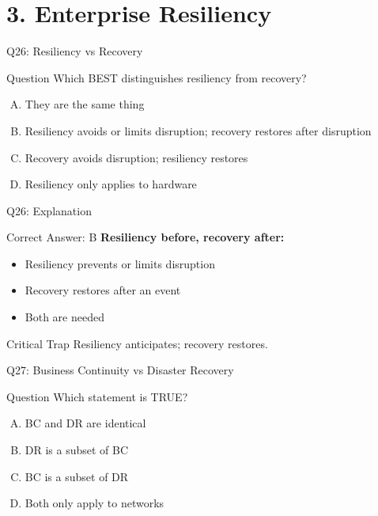 \documentclass{beamer}
\begin{document}
	\section{3. Enterprise Resiliency}
	
	\begin{frame}{Q26: Resiliency vs Recovery}
		\begin{block}{Question}
			Which BEST distinguishes resiliency from recovery?
		\end{block}
		\begin{enumerate}[(A)]
			\item They are the same thing
			\item Resiliency avoids or limits disruption; recovery restores after disruption
			\item Recovery avoids disruption; resiliency restores
			\item Resiliency only applies to hardware
		\end{enumerate}
	\end{frame}
	
	\begin{frame}{Q26: Explanation}
		\begin{block}{Correct Answer: B}
			\textbf{Resiliency before, recovery after:}
			\begin{itemize}
				\item Resiliency prevents or limits disruption
				\item Recovery restores after an event
				\item Both are needed
			\end{itemize}
		\end{block}
		\begin{alertblock}{Critical Trap}
			Resiliency anticipates; recovery restores.
		\end{alertblock}
	\end{frame}
	
	\begin{frame}{Q27: Business Continuity vs Disaster Recovery}
		\begin{block}{Question}
			Which statement is TRUE?
		\end{block}
		\begin{enumerate}[(A)]
			\item BC and DR are identical
			\item DR is a subset of BC
			\item BC is a subset of DR
			\item Both only apply to networks
		\end{enumerate}
	\end{frame}
	
\end{document}
